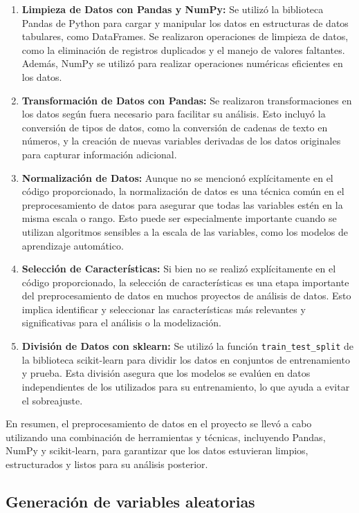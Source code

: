 \documentclass[12pt]{article}
\begin{document}
\begin{enumerate}
    \item \textbf{Limpieza de Datos con Pandas y NumPy:} Se utilizó la biblioteca Pandas de Python para cargar y manipular los datos en estructuras de datos tabulares, como DataFrames. Se realizaron operaciones de limpieza de datos, como la eliminación de registros duplicados y el manejo de valores faltantes. Además, NumPy se utilizó para realizar operaciones numéricas eficientes en los datos.
    \item \textbf{Transformación de Datos con Pandas:} Se realizaron transformaciones en los datos según fuera necesario para facilitar su análisis. Esto incluyó la conversión de tipos de datos, como la conversión de cadenas de texto en números, y la creación de nuevas variables derivadas de los datos originales para capturar información adicional.
    \item \textbf{Normalización de Datos:} Aunque no se mencionó explícitamente en el código proporcionado, la normalización de datos es una técnica común en el preprocesamiento de datos para asegurar que todas las variables estén en la misma escala o rango. Esto puede ser especialmente importante cuando se utilizan algoritmos sensibles a la escala de las variables, como los modelos de aprendizaje automático.
    \item \textbf{Selección de Características:} Si bien no se realizó explícitamente en el código proporcionado, la selección de características es una etapa importante del preprocesamiento de datos en muchos proyectos de análisis de datos. Esto implica identificar y seleccionar las características más relevantes y significativas para el análisis o la modelización.
    \item \textbf{División de Datos con sklearn:} Se utilizó la función \texttt{train\_test\_split} de la biblioteca scikit-learn para dividir los datos en conjuntos de entrenamiento y prueba. Esta división asegura que los modelos se evalúen en datos independientes de los utilizados para su entrenamiento, lo que ayuda a evitar el sobreajuste.
\end{enumerate}

En resumen, el preprocesamiento de datos en el proyecto se llevó a cabo utilizando una combinación de herramientas y técnicas, incluyendo Pandas, NumPy y scikit-learn, para garantizar que los datos estuvieran limpios, estructurados y listos para su análisis posterior.

\subsection*{Generación de variables aleatorias}
\end{document}
